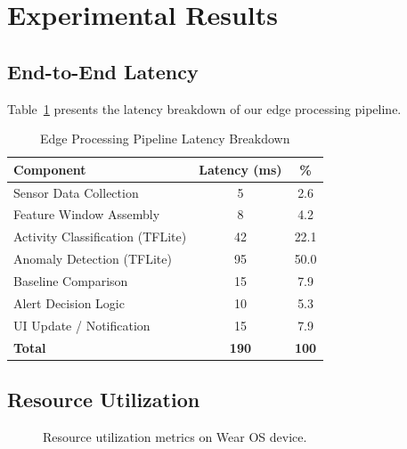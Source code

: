 \documentclass[conference]{IEEEtran}
\begin{document}
\section{Experimental Results}

\subsection{End-to-End Latency}
Table~\ref{tab:latency} presents the latency breakdown of our edge processing pipeline.

\begin{table}[H]
\centering
\caption{Edge Processing Pipeline Latency Breakdown}
\label{tab:latency}
\begin{tabular}{lcc}
\toprule
\textbf{Component} & \textbf{Latency (ms)} & \textbf{\%} \\
\midrule
Sensor Data Collection & 5 & 2.6 \\
Feature Window Assembly & 8 & 4.2 \\
Activity Classification (TFLite) & 42 & 22.1 \\
Anomaly Detection (TFLite) & 95 & 50.0 \\
Baseline Comparison & 15 & 7.9 \\
Alert Decision Logic & 10 & 5.3 \\
UI Update / Notification & 15 & 7.9 \\
\midrule
\textbf{Total} & \textbf{190} & \textbf{100} \\
\bottomrule
\end{tabular}
\end{table}

\subsection{Resource Utilization}

\begin{figure}[H]
\centering
{}
\caption{Resource utilization metrics on Wear OS device.}
\label{fig:resources}
\end{figure}
\end{document}
